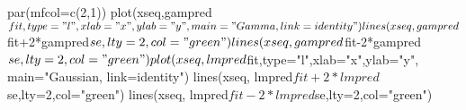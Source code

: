 \begin{Schunk}
\begin{Sinput}
 par(mfcol=c(2,1))
 plot(xseq,gampred$fit,type="l",xlab="x",ylab="y", main="Gamma, link=identity")
 lines(xseq, gampred$fit+2*gampred$se,lty=2,col="green")
 lines(xseq, gampred$fit-2*gampred$se,lty=2,col="green")
 plot(xseq,lmpred$fit,type="l",xlab="x",ylab="y", main="Gaussian, link=identity")
 lines(xseq, lmpred$fit+2*lmpred$se,lty=2,col="green")
 lines(xseq, lmpred$fit-2*lmpred$se,lty=2,col="green")
 
\end{Sinput}
\end{Schunk}
